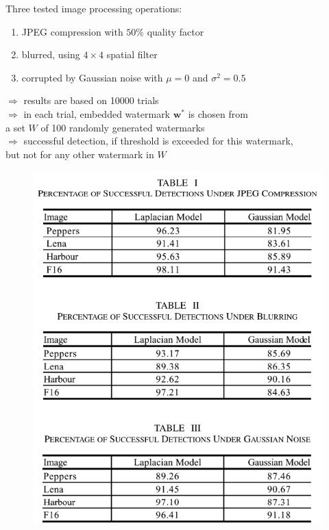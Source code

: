 \begin{frame}{\insertsection}

	Three tested image processing operations:
	\vspace{2mm}
	\begin{enumerate}
	\item JPEG compression with $50\%$ quality factor
	\item blurred, using $4 \times 4$ spatial filter
	\item corrupted by Gaussian noise with $\mu = 0$ and $\sigma^2 = 0.5$ 
	\end{enumerate}
	\vspace{5mm}
	\textcolor{TUDblue}{$\Rightarrow$} results are based on 10000 trials \\
	\textcolor{TUDblue}{$\Rightarrow$} in each trial, embedded watermark $\bm w^*$ is chosen from \\ \hspace{3.5mm} a set $W$ of 100 randomly generated watermarks \\
	\textcolor{TUDblue}{$\Rightarrow$} successful detection, if threshold is exceeded for this watermark, \\ \hspace{3.5mm} but not for any other watermark in $W$
	
\end{frame}

\begin{frame}{\insertsection}
\vspace{-6mm}
	\begin{figure}
	\centering
	\includegraphics[height=\textheight]{Bilder/tablesall} 
	\end{figure}
\end{frame}